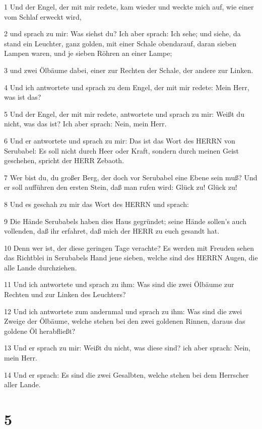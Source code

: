 \par 1 Und der Engel, der mit mir redete, kam wieder und weckte mich auf, wie einer vom Schlaf erweckt wird,
\par 2 und sprach zu mir: Was siehst du? Ich aber sprach: Ich sehe; und siehe, da stand ein Leuchter, ganz golden, mit einer Schale obendarauf, daran sieben Lampen waren, und je sieben Röhren an einer Lampe;
\par 3 und zwei Ölbäume dabei, einer zur Rechten der Schale, der andere zur Linken.
\par 4 Und ich antwortete und sprach zu dem Engel, der mit mir redete: Mein Herr, was ist das?
\par 5 Und der Engel, der mit mir redete, antwortete und sprach zu mir: Weißt du nicht, was das ist? Ich aber sprach: Nein, mein Herr.
\par 6 Und er antwortete und sprach zu mir: Das ist das Wort des HERRN von Serubabel: Es soll nicht durch Heer oder Kraft, sondern durch meinen Geist geschehen, spricht der HERR Zebaoth.
\par 7 Wer bist du, du großer Berg, der doch vor Serubabel eine Ebene sein muß? Und er soll aufführen den ersten Stein, daß man rufen wird: Glück zu! Glück zu!
\par 8 Und es geschah zu mir das Wort des HERRN und sprach:
\par 9 Die Hände Serubabels haben dies Haus gegründet; seine Hände sollen's auch vollenden, daß ihr erfahret, daß mich der HERR zu euch gesandt hat.
\par 10 Denn wer ist, der diese geringen Tage verachte? Es werden mit Freuden sehen das Richtblei in Serubabels Hand jene sieben, welche sind des HERRN Augen, die alle Lande durchziehen.
\par 11 Und ich antwortete und sprach zu ihm: Was sind die zwei Ölbäume zur Rechten und zur Linken des Leuchters?
\par 12 Und ich antwortete zum andernmal und sprach zu ihm: Was sind die zwei Zweige der Ölbäume, welche stehen bei den zwei goldenen Rinnen, daraus das goldene Öl herabfließt?
\par 13 Und er sprach zu mir: Weißt du nicht, was diese sind? ich aber sprach: Nein, mein Herr.
\par 14 Und er sprach: Es sind die zwei Gesalbten, welche stehen bei dem Herrscher aller Lande.

\chapter{5}

